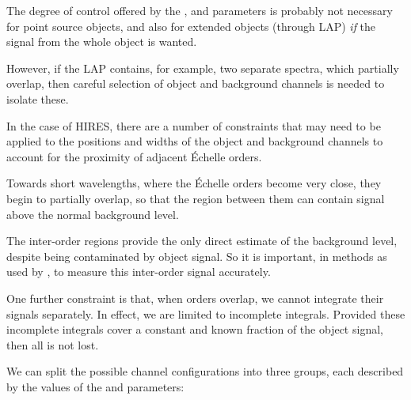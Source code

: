 The degree of control offered by the ,
 and 
parameters is probably not necessary for point source objects, and
also for extended objects (through LAP) {\em if} the signal from the whole
object is wanted.

However, if the LAP contains, for example, two separate spectra, which
partially overlap, then careful selection of object and background
channels is needed to isolate these.

In the case of HIRES, there are a number of constraints that may need to be
applied to the positions and widths of the object and background channels to
account for the proximity of adjacent \'{E}chelle orders.

Towards short wavelengths, where the \'{E}chelle orders become very close, they
begin to partially overlap, so that the region between them can contain
signal above the normal background level.

The inter-order regions provide the only direct estimate of the background
level, despite being contaminated by object signal.  So it is important, in
methods as used by , to measure this
inter-order signal accurately.

One further constraint is that, when orders overlap, we cannot integrate
their signals separately.  In effect, we are limited to incomplete
integrals.  Provided these incomplete integrals cover a constant and
known fraction of the object signal, then all is not lost.

We can split the possible channel configurations into three groups, each
described by the values of the 
and  parameters:


